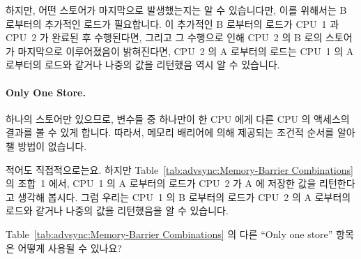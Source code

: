 	하지만, 어떤 스토어가 마지막으로 발생했는지는 알 수 있습니다만, 이를
	위해서는 B 로부터의 추가적인 로드가 필요합니다.
	이 추가적인 B 로부터의 로드가 CPU~1 과 CPU~2 가 완료된 후 수행된다면,
	그리고 그 수행으로 인해 CPU~2 의 B 로의 스토어가 마지막으로
	이루어졌음이 밝혀진다면, CPU~2 의 A 로부터의 로드는 CPU~1 의 A 로부터의
	로드와 같거나 나중의 값을 리턴했음 역시 알 수 있습니다.

\paragraph{Only One Store.}
	하나의 스토어만 있으므로, 변수들 중 하나만이 한 CPU 에게 다른 CPU 의
	액세스의 결과를 볼 수 있게 합니다.
	따라서, 메모리 배리어에 의해 제공되는 조건적 순서를 알아챌 방법이
	없습니다.

	적어도 직접적으로는요.
	하지만 Table~\ref{tab:advsync:Memory-Barrier Combinations} 의 조합~1
	에서, CPU~1 의 A 로부터의 로드가 CPU~2 가 A 에 저장한 값을 리턴한다고
	생각해 봅시다.
	그럼 우리는 CPU~1 의 B 로부터의 로드가 CPU~2 의 A 로부터의 로드와
	같거나 나중의 값을 리턴했음을 알 수 있습니다.

\QuickQuiz{}
	Table~\ref{tab:advsync:Memory-Barrier Combinations} 의 다른 ``Only one
	store'' 항목은 어떻게 사용될 수 있나요?
	\iffalse

